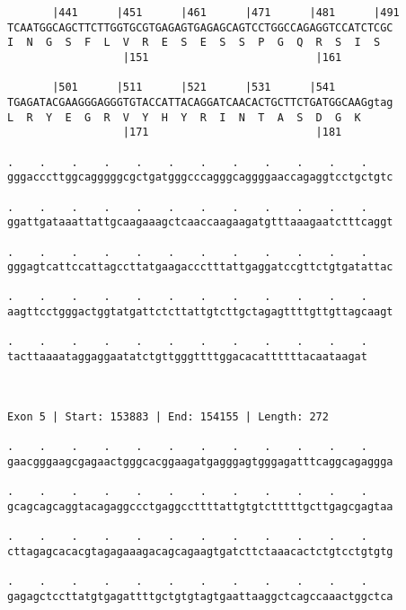 \documentclass{article}
\begin{document}
\begin{Verbatim}
       |441      |451      |461      |471      |481      |491
TCAATGGCAGCTTCTTGGTGCGTGAGAGTGAGAGCAGTCCTGGCCAGAGGTCCATCTCGC
I  N  G  S  F  L  V  R  E  S  E  S  S  P  G  Q  R  S  I  S  
                  |151                          |161        
  
       |501      |511      |521      |531      |541         
TGAGATACGAAGGGAGGGTGTACCATTACAGGATCAACACTGCTTCTGATGGCAAGgtag
L  R  Y  E  G  R  V  Y  H  Y  R  I  N  T  A  S  D  G  K     
                  |171                          |181        
  
.    .    .    .    .    .    .    .    .    .    .    .    
gggacccttggcagggggcgctgatgggcccagggcaggggaaccagaggtcctgctgtc
                                                            
.    .    .    .    .    .    .    .    .    .    .    .    
ggattgataaattattgcaagaaagctcaaccaagaagatgtttaaagaatctttcaggt
                                                            
.    .    .    .    .    .    .    .    .    .    .    .    
gggagtcattccattagccttatgaagaccctttattgaggatccgttctgtgatattac
                                                            
.    .    .    .    .    .    .    .    .    .    .    .    
aagttcctgggactggtatgattctcttattgtcttgctagagttttgttgttagcaagt
                                                            
.    .    .    .    .    .    .    .    .    .    .    .
tacttaaaataggaggaatatctgttgggttttggacacattttttacaataagat
                                                        
                                                        
 
Exon 5 | Start: 153883 | End: 154155 | Length: 272
 
.    .    .    .    .    .    .    .    .    .    .    .    
gaacgggaagcgagaactgggcacggaagatgagggagtgggagatttcaggcagaggga
                                                            
.    .    .    .    .    .    .    .    .    .    .    .    
gcagcagcaggtacagaggccctgaggccttttattgtgtctttttgcttgagcgagtaa
                                                            
.    .    .    .    .    .    .    .    .    .    .    .    
cttagagcacacgtagagaaagacagcagaagtgatcttctaaacactctgtcctgtgtg
                                                            
.    .    .    .    .    .    .    .    .    .    .    .    
gagagctccttatgtgagattttgctgtgtagtgaattaaggctcagccaaactggctca
                                                            

\end{Verbatim}
\end{document}
